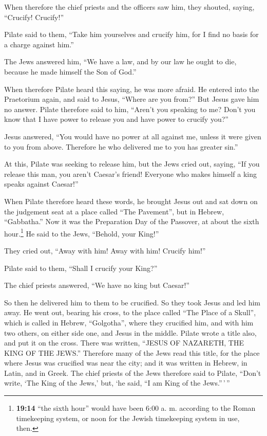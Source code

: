  When therefore the chief priests and the officers saw
him, they shouted, saying, ``Crucify! Crucify!''

Pilate said to them, ``Take him yourselves and crucify him, for I find
no basis for a charge against him.''

 The Jews answered him, ``We have a law, and by our law he
ought to die, because he made himself the Son of God.''

 When therefore Pilate heard this saying, he was more
afraid.  He entered into the Praetorium again, and said to
Jesus, ``Where are you from?'' But Jesus gave him no answer.
 Pilate therefore said to him, ``Aren't you speaking to
me? Don't you know that I have power to release you and have power to
crucify you?''

 Jesus answered, ``You would have no power at all against
me, unless it were given to you from above. Therefore he who delivered
me to you has greater sin.''

 At this, Pilate was seeking to release him, but the Jews
cried out, saying, ``If you release this man, you aren't Caesar's
friend! Everyone who makes himself a king speaks against Caesar!''

 When Pilate therefore heard these words, he brought
Jesus out and sat down on the judgement seat at a place called ``The
Pavement'', but in Hebrew, ``Gabbatha.''  Now it was the
Preparation Day of the Passover, at about the sixth hour.\footnote{\textbf{19:14}
  ``the sixth hour'' would have been 6:00 a. m. according to the Roman
  timekeeping system, or noon for the Jewish timekeeping system in use,
  then.} He said to the Jews, ``Behold, your King!''

 They cried out, ``Away with him! Away with him! Crucify
him!''

Pilate said to them, ``Shall I crucify your King?''

The chief priests answered, ``We have no king but Caesar!''

 So then he delivered him to them to be crucified. So
they took Jesus and led him away.  He went out, bearing
his cross, to the place called ``The Place of a Skull'', which is called
in Hebrew, ``Golgotha'',  where they crucified him, and
with him two others, on either side one, and Jesus in the middle.
 Pilate wrote a title also, and put it on the cross.
There was written, ``JESUS OF NAZARETH, THE KING OF THE JEWS.''
 Therefore many of the Jews read this title, for the
place where Jesus was crucified was near the city; and it was written in
Hebrew, in Latin, and in Greek.  The chief priests of the
Jews therefore said to Pilate, ``Don't write, `The King of the Jews,'
but, `he said, ``I am King of the Jews.''\,'\,''

